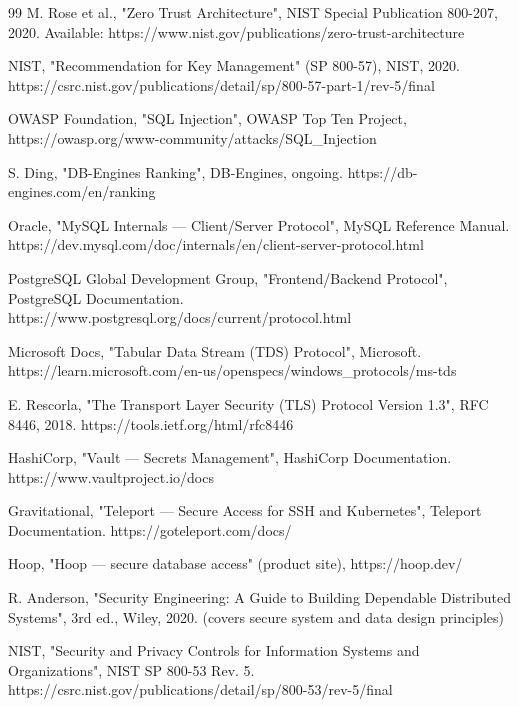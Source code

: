 \documentclass[12pt,a4paper]{report}
\begin{document}
\renewcommand{\bibname}{References}
\begin{thebibliography}{99}
M. Rose et al., "Zero Trust Architecture", NIST Special Publication 800-207, 2020. Available: https://www.nist.gov/publications/zero-trust-architecture

NIST, "Recommendation for Key Management" (SP 800-57), NIST, 2020. https://csrc.nist.gov/publications/detail/sp/800-57-part-1/rev-5/final

OWASP Foundation, "SQL Injection", OWASP Top Ten Project, https://owasp.org/www-community/attacks/SQL\_Injection

S. Ding, "DB-Engines Ranking", DB-Engines, ongoing. https://db-engines.com/en/ranking

Oracle, "MySQL Internals — Client/Server Protocol", MySQL Reference Manual. https://dev.mysql.com/doc/internals/en/client-server-protocol.html

PostgreSQL Global Development Group, "Frontend/Backend Protocol", PostgreSQL Documentation. https://www.postgresql.org/docs/current/protocol.html

Microsoft Docs, "Tabular Data Stream (TDS) Protocol", Microsoft. https://learn.microsoft.com/en-us/openspecs/windows\_protocols/ms-tds

E. Rescorla, "The Transport Layer Security (TLS) Protocol Version 1.3", RFC 8446, 2018. https://tools.ietf.org/html/rfc8446

HashiCorp, "Vault — Secrets Management", HashiCorp Documentation. https://www.vaultproject.io/docs

Gravitational, "Teleport — Secure Access for SSH and Kubernetes", Teleport Documentation. https://goteleport.com/docs/

Hoop, "Hoop — secure database access" (product site), https://hoop.dev/

R. Anderson, "Security Engineering: A Guide to Building Dependable Distributed Systems", 3rd ed., Wiley, 2020. (covers secure system and data design principles)

NIST, "Security and Privacy Controls for Information Systems and Organizations", NIST SP 800-53 Rev. 5. https://csrc.nist.gov/publications/detail/sp/800-53/rev-5/final


\end{thebibliography}
\end{document}
